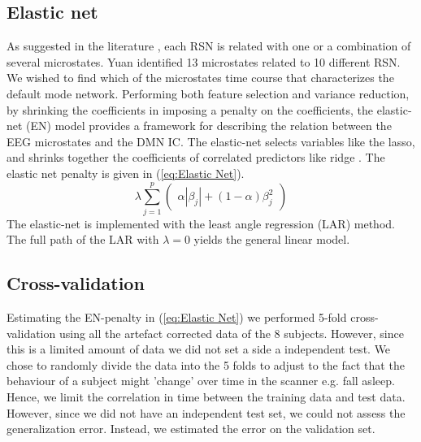 \documentclass{article}
\begin{document}
\subsection{Elastic net}
As suggested in the literature \cite{Yuan20122062}, each RSN is related with one or a combination of several microstates. Yuan identified 13 microstates related to 10 different RSN. We wished to find which of the microstates time course that characterizes the default mode network. Performing both feature selection and variance reduction, by shrinking the coefficients in imposing a penalty on the coefficients, the elastic-net (EN) model \cite{hastie01} provides a framework for  describing the relation between the EEG microstates and the DMN IC.
The elastic-net selects variables like the lasso, and shrinks together the coefficients of correlated predictors like ridge \cite{hastie01}. The elastic net penalty is given in (\ref{eq:Elastic Net}).
\begin{equation}
\label{eq:Elastic Net}
\lambda \sum_{j=1}^p
\begin{pmatrix}
\alpha |\beta_j| + (1-\alpha) \beta_j^2
\end{pmatrix}
\end{equation}
The elastic-net is implemented with the least angle regression (LAR) method. The full path of the LAR with $\lambda=0$ yields the general linear model.


\subsection{Cross-validation}
Estimating the EN-penalty in (\ref{eq:Elastic Net}) we performed 5-fold cross-validation using all the artefact corrected data of the 8 subjects. However, since this is a limited amount of data we did not set a side a independent test.
We chose to randomly divide the data into the 5 folds to adjust to the fact that the behaviour of a subject might 'change' over time in the scanner e.g. fall asleep. Hence, we limit the correlation in time between the training data and test data. However, since we did not have an independent test set, we could not assess the generalization error. Instead, we estimated the error on the validation set.
\end{document}
